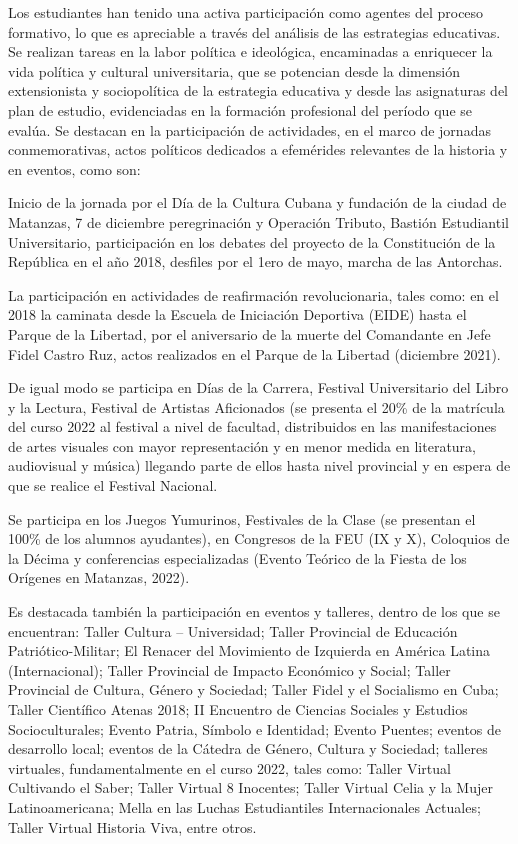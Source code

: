 Los estudiantes han tenido una activa participación como agentes del proceso formativo, lo que es apreciable a través del análisis de las estrategias educativas. Se realizan tareas en la labor política e ideológica, encaminadas a enriquecer la vida política y cultural universitaria, que se potencian desde la dimensión extensionista y sociopolítica de la estrategia educativa y desde las asignaturas del plan de estudio, evidenciadas en la formación profesional del período que se evalúa. Se destacan en la participación de actividades, en el marco de jornadas conmemorativas, actos políticos dedicados a efemérides relevantes de la historia y en eventos, como son:

Inicio de la jornada por el Día de la Cultura Cubana y fundación de la ciudad de Matanzas, 7 de diciembre peregrinación y Operación Tributo, Bastión Estudiantil Universitario, participación en los debates del proyecto de la Constitución de la República en el año 2018, desfiles por el 1ero de mayo, marcha de las Antorchas. 

La participación en actividades de reafirmación revolucionaria, tales como: en el 2018 la caminata desde la Escuela de Iniciación Deportiva (EIDE) hasta el Parque de la Libertad, por el aniversario de la muerte del Comandante en Jefe Fidel Castro Ruz, actos realizados en el Parque de la Libertad (diciembre 2021).

De igual modo se participa en Días de la Carrera, Festival Universitario del Libro y la Lectura, Festival de Artistas Aficionados (se presenta el 20\% de la matrícula del curso 2022 al festival a nivel de facultad, distribuidos en las manifestaciones de artes visuales con mayor representación y en menor medida en literatura, audiovisual y música) llegando parte de ellos hasta nivel provincial y en espera de que se realice el Festival Nacional. 

Se participa en los Juegos Yumurinos, Festivales de la Clase (se presentan el 100\% de los alumnos ayudantes), en Congresos de la FEU (IX y X), Coloquios de la Décima y conferencias especializadas (Evento Teórico de la Fiesta de los Orígenes en Matanzas, 2022).

Es destacada también la participación en eventos y talleres, dentro de los que se encuentran:  Taller Cultura – Universidad; Taller Provincial de Educación Patriótico-Militar;  El Renacer del Movimiento de Izquierda en América Latina (Internacional); Taller Provincial de Impacto Económico y Social; Taller Provincial de Cultura, Género y Sociedad; Taller Fidel y el Socialismo en Cuba; Taller Científico Atenas 2018; II Encuentro de Ciencias Sociales y Estudios Socioculturales; Evento Patria, Símbolo e Identidad; Evento Puentes; eventos de desarrollo local; eventos de la Cátedra de Género, Cultura y Sociedad; talleres virtuales, fundamentalmente en el curso 2022, tales como: Taller Virtual Cultivando el Saber; Taller Virtual 8 Inocentes; Taller Virtual Celia y la Mujer Latinoamericana; Mella en las Luchas Estudiantiles Internacionales Actuales; Taller Virtual Historia Viva, entre otros.

